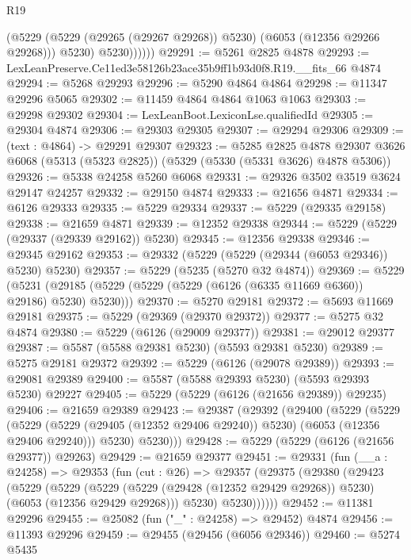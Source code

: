 \begin{lexlean}{R19}
\begin{coremodule}
                  (@5229 (@5229 (@29265 (@29267 @29268)) @5230) (@6053 (@12356 @29266 @29268)))
                  @5230)
                @5230))))))
@29291 := @5261 @2825 @4878
@29293 := LexLeanPreserve.Ce11ed3e58126b23ace35b9ff1b93d0f8.R19.__fits_66 @4874
@29294 := @5268 @29293
@29296 := @5290 @4864 @4864
@29298 := @11347 @29296 @5065
@29302 := @11459 @4864 @4864 @1063 @1063
@29303 := @29298 @29302
@29304 := LexLeanBoot.LexiconLse.qualifiedId
@29305 := @29304 @4874
@29306 := @29303 @29305
@29307 := @29294 @29306
@29309 := (text : @4864) -> @29291 @29307
@29323 := @5285
    @2825
    @4878
    @29307
    @3626
    @6068
    (@5313 (@5323 @2825))
    (@5329 (@5330 (@5331 @3626) @4878 @5306))
@29326 := @5338 @24258 @5260 @6068
@29331 := @29326 @3502 @3519 @3624 @29147 @24257
@29332 := @29150 @4874
@29333 := @21656 @4871
@29334 := @6126 @29333
@29335 := @5229 @29334
@29337 := @5229 (@29335 @29158)
@29338 := @21659 @4871
@29339 := @12352 @29338
@29344 := @5229 (@5229 (@29337 (@29339 @29162)) @5230)
@29345 := @12356 @29338
@29346 := @29345 @29162
@29353 := @29332 (@5229 (@5229 (@29344 (@6053 @29346)) @5230) @5230)
@29357 := @5229 (@5235 (@5270 @32 @4874))
@29369 := @5229
    (@5231 (@29185 (@5229 (@5229 (@5229 (@6126 (@6335 @11669 @6360)) @29186) @5230) @5230)))
@29370 := @5270 @29181
@29372 := @5693 @11669 @29181
@29375 := @5229 (@29369 (@29370 @29372))
@29377 := @5275 @32 @4874
@29380 := @5229 (@6126 (@29009 @29377))
@29381 := @29012 @29377
@29387 := @5587 (@5588 @29381 @5230) (@5593 @29381 @5230)
@29389 := @5275 @29181 @29372
@29392 := @5229 (@6126 (@29078 @29389))
@29393 := @29081 @29389
@29400 := @5587 (@5588 @29393 @5230) (@5593 @29393 @5230) @29227
@29405 := @5229 (@5229 (@6126 (@21656 @29389)) @29235)
@29406 := @21659 @29389
@29423 := @29387
    (@29392
      (@29400
        (@5229
          (@5229
            (@5229 (@5229 (@29405 (@12352 @29406 @29240)) @5230) (@6053 (@12356 @29406 @29240)))
            @5230)
          @5230)))
@29428 := @5229 (@5229 (@6126 (@21656 @29377)) @29263)
@29429 := @21659 @29377
@29451 := @29331
    (fun (__a : @24258) =>
    @29353
      (fun (cut : @26) =>
      @29357
        (@29375
          (@29380
            (@29423
              (@5229
                (@5229
                  (@5229
                    (@5229 (@29428 (@12352 @29429 @29268)) @5230)
                    (@6053 (@12356 @29429 @29268)))
                  @5230)
                @5230))))))
@29452 := @11381 @29296
@29455 := @25082 (fun ("_" : @24258) => @29452) @4874
@29456 := @11393 @29296
@29459 := @29455 (@29456 (@6056 @29346))
@29460 := @5274 @5435

\end{coremodule}
\end{lexlean}
